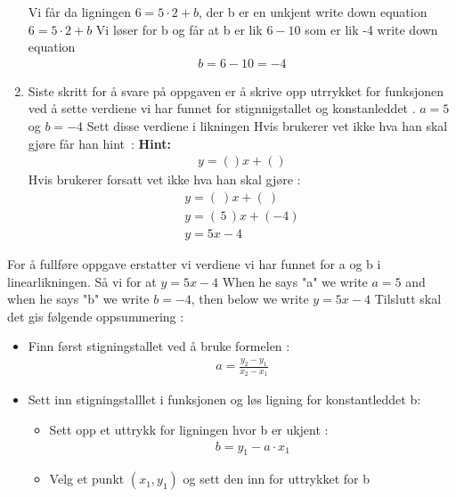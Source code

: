 \documentclass[12pt,twoside,onecolumn]{article}
\begin{document}
\begin{Exercise}
\begin{enumerate}
\begin{figure}[h!]
\end{figure}
{\color{gray} Vi får da ligningen $6=5\cdot 2+b$, der b er en unkjent} \newline
{\color{PineGreen} write down equation 
\newline
$6=5\cdot 2+b$}
\newline
{\color{gray} Vi løser for b og får at b er lik $6-10$ som er lik -4}
\newline
{\color{PineGreen} write down equation
\begin{align}
b=6-10=-4
\end{align}}
\item Siste skritt for å svare på oppgaven er å skrive opp utrrykket for funksjonen ved å sette verdiene vi har funnet for stignnigstallet og konstanleddet .
\newline
$a=5$ og $b=-4$
\newline
Sett disse verdiene i likningen
{\color{Maroon}
Hvis brukerer vet ikke hva han skal gjøre får han \mbox{hint :}} 
\newline
\textbf{Hint:}
\begin{align}
y = ()x + ()
\end{align}
{\color{Maroon}
Hvis brukerer forsatt vet ikke hva han skal gjøre :}
\begin{align}
y = (\:)x + (\:)\\
y = (\, 5 \, )x  + (-4 )  \\
y = 5x - 4
\end{align}
\end{enumerate}
{\color{gray}For å fullføre oppgave erstatter vi verdiene vi har funnet for a og b i linearlikningen. Så vi for at $y=5x-4$}
\newline
{\color{PineGreen} When he says "a" we write $a=5$ and when he says "b" we write $b=-4$, then below we write $y=5x-4$} 
\newline
{\color{Maroon}Tilslutt skal det gis følgende oppsummering :}
\begin{itemize}
\item Finn først stigningstallet ved å bruke formelen :
\begin{align}
a =  \frac{y_2 - y_1}{x_2 - x_1}
\end{align}
\item Sett inn stigningstalllet i funksjonen og løs ligning for konstantleddet b:
\begin{itemize}
\item Sett opp et uttrykk for ligningen hvor b er ukjent :
\begin{align}
b = y_1 - a\cdot x_1
\end{align}
\item Velg et punkt $(x_1, y_1)$ og sett den inn for uttrykket for b
\end{itemize}
\end{itemize}
\end{Exercise}
\end{document}
